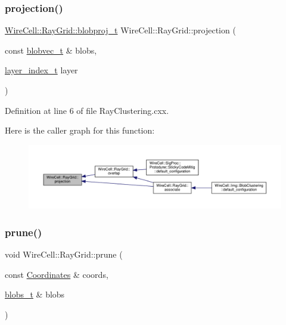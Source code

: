 \subsubsection{\texorpdfstring{projection()}{projection()}}
{\footnotesize\ttfamily \hyperlink{namespace_wire_cell_1_1_ray_grid_a2495e73e12fdf4e81ffef9d99f8a8e22}{Wire\+Cell\+::\+Ray\+Grid\+::blobproj\+\_\+t} Wire\+Cell\+::\+Ray\+Grid\+::projection (\begin{DoxyParamCaption}\item[{const \hyperlink{namespace_wire_cell_1_1_ray_grid_a3154c64db4d07056418dfcd1afbf0531}{blobvec\+\_\+t} \&}]{blobs,  }\item[{\hyperlink{namespace_wire_cell_1_1_ray_grid_ab7562e54b58eede813d5b70b5eb85812}{layer\+\_\+index\+\_\+t}}]{layer }\end{DoxyParamCaption})}



Definition at line 6 of file Ray\+Clustering.\+cxx.

Here is the caller graph for this function\+:
\nopagebreak
\begin{figure}[H]
\begin{center}
\leavevmode
\includegraphics[width=350pt]{namespace_wire_cell_1_1_ray_grid_ab1dc12b3013c5cc290ca5f8d945d54e5_icgraph}
\end{center}
\end{figure}
\mbox{\label{namespace_wire_cell_1_1_ray_grid_a7d64051adfd2d6d4b1264d7efd841439}} 
\subsubsection{\texorpdfstring{prune()}{prune()}}
{\footnotesize\ttfamily void Wire\+Cell\+::\+Ray\+Grid\+::prune (\begin{DoxyParamCaption}\item[{const \hyperlink{class_wire_cell_1_1_ray_grid_1_1_coordinates}{Coordinates} \&}]{coords,  }\item[{\hyperlink{namespace_wire_cell_1_1_ray_grid_aea2069aff62790df3241ee7446e81ade}{blobs\+\_\+t} \&}]{blobs }\end{DoxyParamCaption})}



